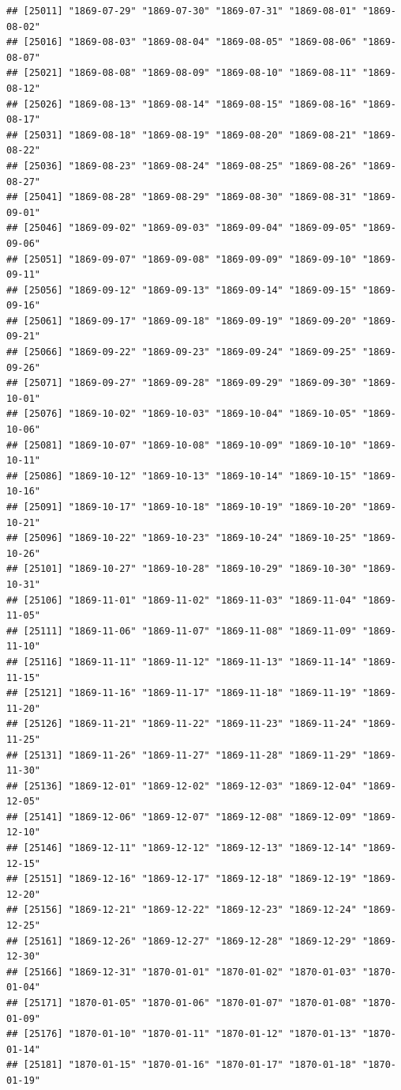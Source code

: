 \documentclass{article}\usepackage[]{graphicx}\usepackage[]{color}
\makeatletter
\newenvironment{kframe}{%
 \def\at@end@of@kframe{}%
 \ifinner\ifhmode%
  \def\at@end@of@kframe{\end{minipage}}%
  \begin{minipage}{\columnwidth}%
 \fi\fi%
 \def\FrameCommand##1{\hskip\@totalleftmargin \hskip-\fboxsep
 \colorbox{shadecolor}{##1}\hskip-\fboxsep
     \hskip-\linewidth \hskip-\@totalleftmargin \hskip\columnwidth}%
 \MakeFramed {\advance\hsize-\width
   \@totalleftmargin\z@ \linewidth\hsize
   \@setminipage}}%
 {\par\unskip\endMakeFramed%
 \at@end@of@kframe}
\newenvironment{knitrout}{}{} %
\makeatother
\begin{document}
\begin{description}
\begin{knitrout}
\begin{kframe}
\begin{verbatim}
## [25011] "1869-07-29" "1869-07-30" "1869-07-31" "1869-08-01" "1869-08-02"
## [25016] "1869-08-03" "1869-08-04" "1869-08-05" "1869-08-06" "1869-08-07"
## [25021] "1869-08-08" "1869-08-09" "1869-08-10" "1869-08-11" "1869-08-12"
## [25026] "1869-08-13" "1869-08-14" "1869-08-15" "1869-08-16" "1869-08-17"
## [25031] "1869-08-18" "1869-08-19" "1869-08-20" "1869-08-21" "1869-08-22"
## [25036] "1869-08-23" "1869-08-24" "1869-08-25" "1869-08-26" "1869-08-27"
## [25041] "1869-08-28" "1869-08-29" "1869-08-30" "1869-08-31" "1869-09-01"
## [25046] "1869-09-02" "1869-09-03" "1869-09-04" "1869-09-05" "1869-09-06"
## [25051] "1869-09-07" "1869-09-08" "1869-09-09" "1869-09-10" "1869-09-11"
## [25056] "1869-09-12" "1869-09-13" "1869-09-14" "1869-09-15" "1869-09-16"
## [25061] "1869-09-17" "1869-09-18" "1869-09-19" "1869-09-20" "1869-09-21"
## [25066] "1869-09-22" "1869-09-23" "1869-09-24" "1869-09-25" "1869-09-26"
## [25071] "1869-09-27" "1869-09-28" "1869-09-29" "1869-09-30" "1869-10-01"
## [25076] "1869-10-02" "1869-10-03" "1869-10-04" "1869-10-05" "1869-10-06"
## [25081] "1869-10-07" "1869-10-08" "1869-10-09" "1869-10-10" "1869-10-11"
## [25086] "1869-10-12" "1869-10-13" "1869-10-14" "1869-10-15" "1869-10-16"
## [25091] "1869-10-17" "1869-10-18" "1869-10-19" "1869-10-20" "1869-10-21"
## [25096] "1869-10-22" "1869-10-23" "1869-10-24" "1869-10-25" "1869-10-26"
## [25101] "1869-10-27" "1869-10-28" "1869-10-29" "1869-10-30" "1869-10-31"
## [25106] "1869-11-01" "1869-11-02" "1869-11-03" "1869-11-04" "1869-11-05"
## [25111] "1869-11-06" "1869-11-07" "1869-11-08" "1869-11-09" "1869-11-10"
## [25116] "1869-11-11" "1869-11-12" "1869-11-13" "1869-11-14" "1869-11-15"
## [25121] "1869-11-16" "1869-11-17" "1869-11-18" "1869-11-19" "1869-11-20"
## [25126] "1869-11-21" "1869-11-22" "1869-11-23" "1869-11-24" "1869-11-25"
## [25131] "1869-11-26" "1869-11-27" "1869-11-28" "1869-11-29" "1869-11-30"
## [25136] "1869-12-01" "1869-12-02" "1869-12-03" "1869-12-04" "1869-12-05"
## [25141] "1869-12-06" "1869-12-07" "1869-12-08" "1869-12-09" "1869-12-10"
## [25146] "1869-12-11" "1869-12-12" "1869-12-13" "1869-12-14" "1869-12-15"
## [25151] "1869-12-16" "1869-12-17" "1869-12-18" "1869-12-19" "1869-12-20"
## [25156] "1869-12-21" "1869-12-22" "1869-12-23" "1869-12-24" "1869-12-25"
## [25161] "1869-12-26" "1869-12-27" "1869-12-28" "1869-12-29" "1869-12-30"
## [25166] "1869-12-31" "1870-01-01" "1870-01-02" "1870-01-03" "1870-01-04"
## [25171] "1870-01-05" "1870-01-06" "1870-01-07" "1870-01-08" "1870-01-09"
## [25176] "1870-01-10" "1870-01-11" "1870-01-12" "1870-01-13" "1870-01-14"
## [25181] "1870-01-15" "1870-01-16" "1870-01-17" "1870-01-18" "1870-01-19"

\end{verbatim}
\end{kframe}
\end{knitrout}
\end{description}
\end{document}
